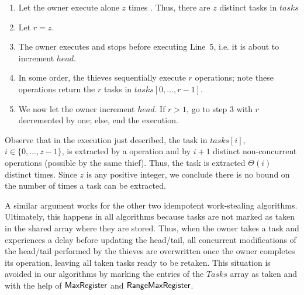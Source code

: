 \begin{enumerate}

\item Let the owner execute alone $z$ times \Put. Thus, there are $z$ distinct tasks in $tasks$

\item Let $r = z$.

\item The owner executes \Take and stops before executing Line~5, i.e.  it is about to increment $head$.

\item In some order, the thieves sequentially execute $r$ \Steal operations; note these \Steal operations return the $r$ tasks in $tasks[0, \hdots, r-1]$.

\item We now let the owner increment $head$. If $r > 1$, go to step 3 with $r$ decremented by one; else, end the execution.
\end{enumerate}

Observe that in the execution just described, the task in $tasks[i]$, $i \in \{0, \hdots, z-1\}$, is extracted by a \Take operation and by $i+1$ distinct non-concurrent \Steal operations (possible by the same thief).  Thus, the task is extracted $\Theta(i)$ distinct times.  Since $z$ is any positive integer, we conclude there is no bound on the number of times a task can be extracted.

A similar argument works for the other two idempotent work-stealing algorithms.  Ultimately, this happens in all algorithms because tasks are not marked as taken in the shared array where they are stored. Thus, when the owner takes a task and experiences a delay before updating the head/tail, all concurrent modifications of the head/tail performed by the thieves are overwritten once the owner completes its operation, leaving all taken tasks ready to be retaken.  This situation is avoided in our algorithms by marking the entries of the $Tasks$ array as taken and with the help of ${\sf MaxRegister}$ and ${\sf RangeMaxRegister}$.


